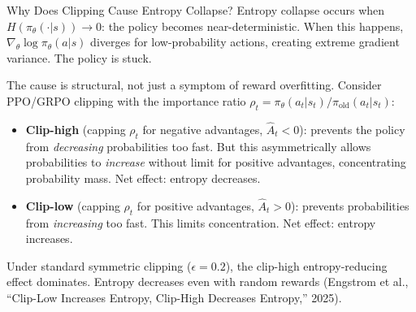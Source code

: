 \begin{thinkfirst}{Why Does Clipping Cause Entropy Collapse?}
Entropy collapse occurs when $H(\pi_\theta(\cdot|s)) \to 0$: the policy becomes near-deterministic. When this happens, $\nabla_\theta \log \pi_\theta(a|s)$ diverges for low-probability actions, creating extreme gradient variance. The policy is stuck.

The cause is structural, not just a symptom of reward overfitting. Consider PPO/GRPO clipping with the importance ratio $\rho_t = \pi_\theta(a_t|s_t) / \pi_{\mathrm{old}}(a_t|s_t)$:

\begin{itemize}
  \item \textbf{Clip-high} (capping $\rho_t$ for negative advantages, $\hat{A}_t < 0$): prevents the policy from \textit{decreasing} probabilities too fast. But this asymmetrically allows probabilities to \textit{increase} without limit for positive advantages, concentrating probability mass. Net effect: entropy decreases.
  \item \textbf{Clip-low} (capping $\rho_t$ for positive advantages, $\hat{A}_t > 0$): prevents probabilities from \textit{increasing} too fast. This limits concentration. Net effect: entropy increases.
\end{itemize}

Under standard symmetric clipping ($\epsilon = 0.2$), the clip-high entropy-reducing effect dominates. Entropy decreases even with random rewards (Engstrom et al., ``Clip-Low Increases Entropy, Clip-High Decreases Entropy,'' 2025).

\begin{center}
\end{center}


\end{thinkfirst}
